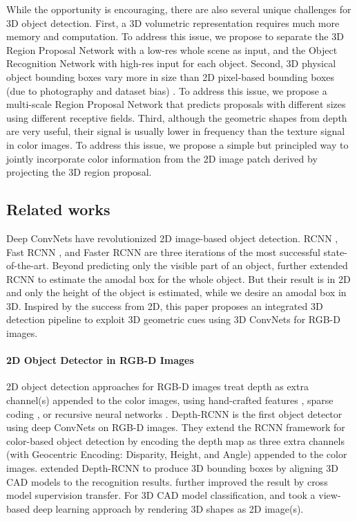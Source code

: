\documentclass[10pt,twocolumn,letterpaper]{article}
\begin{document}
While the opportunity is encouraging, there are also several unique challenges for 3D object detection. First, a 3D volumetric representation requires much more memory and computation. To address this issue, 
we propose to separate the 3D Region Proposal Network with a low-res whole scene as input,
and the Object Recognition Network with high-res input for each object.
Second, 
3D physical object bounding boxes vary more in size than 2D pixel-based bounding boxes (due to photography and dataset bias) \cite{RCNNmR}.
To address this issue, 
we propose a multi-scale Region Proposal Network 
that predicts proposals with different sizes using different receptive fields. 
Third, although the geometric shapes from depth are very useful, 
their signal is usually lower in frequency than the texture signal in color images.
To address this issue, 
we propose a simple but principled way to jointly incorporate color information from the 2D image patch
derived by projecting the 3D region proposal.



\subsection{Related works}

Deep ConvNets have revolutionized 2D image-based object detection. 
RCNN \cite{RCNN}, Fast RCNN  \cite{FastRCNN}, and Faster RCNN \cite{FasterRCNN}
are three iterations of the most successful state-of-the-art. 
Beyond predicting only the visible part of an object,
\cite{amodalKarTCM15} further extended RCNN to estimate the amodal box for the whole object.
But their result is in 2D and only the height of the object is estimated, while we desire an amodal box in 3D.
Inspired by the success from 2D, 
this paper proposes an integrated 3D detection pipeline
to exploit 3D geometric cues 
using 3D ConvNets for RGB-D images.

\vspace{-4mm}\paragraph{2D Object Detector in RGB-D Images}
2D object detection approaches for RGB-D images 
treat depth as extra channel(s) appended to the color images,
using hand-crafted features \cite{guptaCVPR13}, sparse coding \cite{bo2013unsupervised,bo2014learning}, or recursive neural networks \cite{Socher}.
Depth-RCNN \cite{depthRCNN,guptaCVPR15} is the first object detector using deep ConvNets on RGB-D images.
They extend the RCNN framework \cite{RCNN} for color-based object detection 
by encoding the depth map as three extra channels (with Geocentric Encoding: Disparity, Height, and Angle) appended to the color images. 
\cite{guptaCVPR15} extended Depth-RCNN to produce 3D bounding boxes by aligning 3D CAD models to the recognition results.
\cite{gupta2015cross} further improved the result by cross model supervision transfer.
For 3D CAD model classification, 
\cite{su15mvcnn} and \cite{shi2015deeppano} took a view-based deep learning approach by rendering 3D shapes as 2D image(s).
\end{document}
